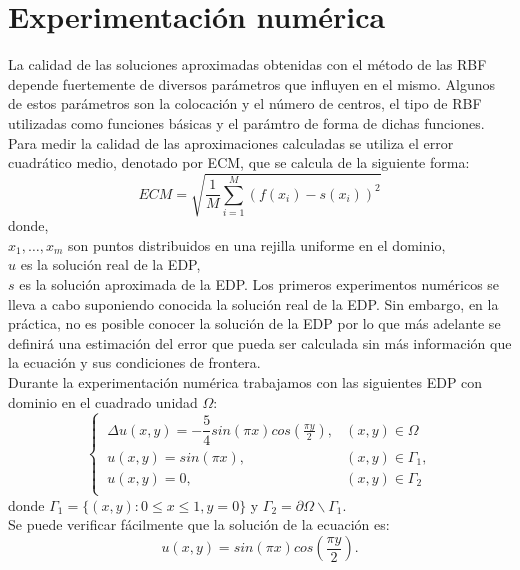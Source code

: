 \documentclass[11pt,a4paper]{article}
\author{Marina Esgueva Ruiz}
\begin{document}
\section{Experimentación numérica}
La calidad de las soluciones aproximadas obtenidas con el método de las RBF depende fuertemente de diversos parámetros que influyen en el mismo. Algunos de estos parámetros son la colocación y el número de centros, el tipo de RBF utilizadas como funciones básicas y el parámtro de forma de dichas funciones. Para medir la calidad de las aproximaciones calculadas se utiliza el error cuadrático medio, denotado por ECM, que se calcula de la siguiente forma: 
$$ECM=\sqrt{\frac{1}{M}\sum_{i=1}^M (f(x_i)-s(x_i))^2}$$
donde, \\
$x_1,\ldots,x_m$ son puntos distribuidos en una rejilla uniforme en el dominio, \\
$u$ es la solución real de la EDP,\\
$s$ es la solución aproximada de la EDP. 
Los primeros experimentos numéricos se lleva a cabo suponiendo conocida la solución real de la EDP. Sin embargo, en la práctica, no es posible conocer la solución de la EDP por lo que más adelante se definirá una estimación del error que pueda ser calculada sin más información que la ecuación y sus condiciones de frontera. \\
Durante la experimentación numérica trabajamos con las siguientes EDP con dominio en el cuadrado unidad $\Omega$: 
\begin{equation}
\left \lbrace \begin{array}{cc}
\ \Delta u(x,y)=-\dfrac{5}{4}sin(\pi x) cos(\frac{\pi y}{2}), & (x,y) \in \Omega \\
\ u(x,y)=sin(\pi x), & (x,y)\in \Gamma_1, \\
\ u(x,y)=0, & (x,y) \in \Gamma_2\\ 
\end{array} \right.
\label{edp1}
\end{equation}
donde $\Gamma_1=\lbrace (x,y):0\leq x \leq 1, y=0 \rbrace$ y $\Gamma_2= \partial \Omega \backslash \Gamma_1$.\\
Se puede verificar fácilmente que la solución de la ecuación es: 
$$u(x,y)=sin(\pi x) cos(\frac{\pi y}{2}).$$
\end{document}
